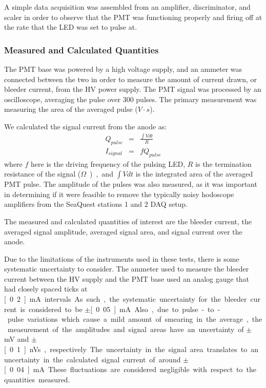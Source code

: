 A simple data acquisition was assembled from an amplifier, discriminator, and scaler in order to observe that the PMT was functioning properly and firing off at the rate that the LED was set to pulse at.

\subsubsection{Measured and Calculated Quantities}

The PMT base was powered by a high voltage supply, and an ammeter was connected between the two in order to measure the amount of current drawn, or bleeder current, from the HV power supply. The PMT signal was processed by an oscilloscope, averaging the pulse over 300 pulses. The primary measurement was measuring the area of the averaged pulse ($V\cdot s$).

We calculated the signal current from the anode as:
\begin{eqnarray}
	Q_{pulse} & = & \frac{\int V dt}{R} \\
	I_{signal} & = & f Q_{pulse}
\end{eqnarray}
where $f$ here is the driving frequency of the pulsing LED, $R$ is the termination resistance of the signal (\unit[50]{$\Omega$}), and $\int V dt$ is the integrated area of the averaged PMT pulse. The amplitude of the pulses was also measured, as it was important in determining if it were feasible to remove the typically noisy hodoscope amplifiers from the SeaQuest stations 1 and 2 DAQ setup.

The measured and calculated quantities of interest are the bleeder current, the averaged signal amplitude, averaged signal area, and signal current over the anode.

Due to the limitations of the instruments used in these tests, there is some systematic uncertainty to consider. The ammeter used to measure the bleeder current between the HV supply and the PMT base used an analog gauge that had closely spaced ticks at \unit[0.2]{mA} intervals. As such, the systematic uncertainty for the bleeder current is considered to be $\pm$\unit[0.05]{mA}. Also, due to pulse-to-pulse variations which cause a mild amount of smearing in the average, the measurement of the amplitudes and signal areas have an uncertainty of $\pm$\unit[5]{mV} and $\pm$\unit[0.1]{nVs}, respectively. The uncertainty in the signal area translates to an uncertainty in the calculated signal current of around $\pm$\unit[0.04]{mA}. These fluctuations are considered negligible with respect to the quantities measured.

